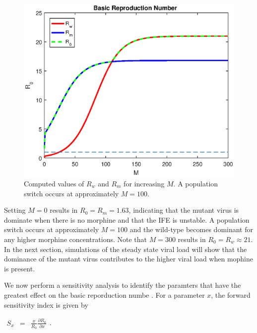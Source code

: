\documentclass[11pt, oneside]{article}    %
\begin{document}
\begin{figure}[H]
\begin{center}
\includegraphics[scale=0.65]{brn.eps}
\caption{Computed values of $R_w$ and $R_m$ for increasing $M$. A population switch occurs at approximately $M=100$.}
\end{center}
\end{figure}


Setting $M=0$ results in $R_0 = R_m = 1.63$, indicating that the mutant virus is dominate when there is no morphine and that the IFE is unstable. A population switch occurs at approximately $M=100$ and the wild-type becomes dominant for any higher morphine concentrations. Note that $M=300$ results in $R_0 = R_w \approx 21$. In the next section, simulations of the steady state viral load will show that the dominance of the mutant virus contributes to the higher viral load when mophine is present.

\vspace{5mm}

 We now perform a sensitivity analysis to identify the paramters that have the greatest effect on the basic reporduction numbe \cite{Marino}. For a parameter $x$, the forward sensitivity index is given by \cite{Perera, Rodrigues}

\begin{center}
$\begin{array}{rcl}
S_x & = & \frac{x}{R_0}\frac{\partial R_0}{\partial x}
\end{array}$.
\end{center}
\end{document}
